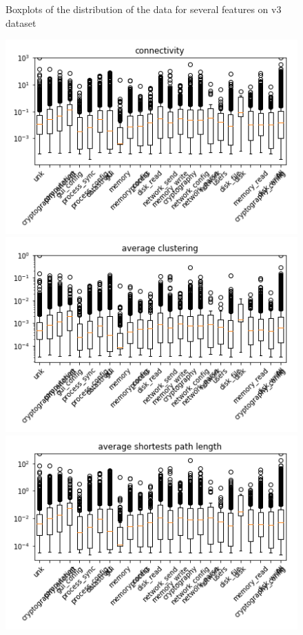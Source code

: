 \begin{appendices}
\begin{figure}[H]
\caption{Boxplots of the distribution of the data for several features on v3 dataset}\label{fig:distribution_analysis6}
\end{figure}




\begin{figure}[H]

%
\centering
\includegraphics[width=0.9\linewidth]{img/boxplots/v3_unbalanced_connectivity.png}
\endminipage
{}%
\centering
\includegraphics[width=0.9\linewidth]{img/boxplots/v3_unbalanced_average_clustering.png}
\endminipage
{}%
\centering
\includegraphics[width=0.9\linewidth]{img/boxplots/v3_unbalanced_average_shortests_path_length.png}
\endminipage


\end{figure}
\end{appendices}
